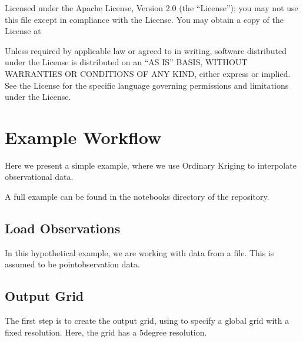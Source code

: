 \documentclass[letterpaper,10pt,english]{sphinxmanual}
\begin{document}
\sphinxAtStartPar
Licensed under the Apache License, Version 2.0 (the “License”);
you may not use this file except in compliance with the License.
You may obtain a copy of the License at
\begin{quote}

\sphinxAtStartPar
{}
\end{quote}

\sphinxAtStartPar
Unless required by applicable law or agreed to in writing, software
distributed under the License is distributed on an “AS IS” BASIS,
WITHOUT WARRANTIES OR CONDITIONS OF ANY KIND, either express or implied.
See the License for the specific language governing permissions and
limitations under the License.

\sphinxstepscope


\chapter{Example Workflow}
\label{\detokenize{workflow:example-workflow}}\label{\detokenize{workflow::doc}}
\sphinxAtStartPar
Here we present a simple example, where we use Ordinary Kriging to interpolate observational data.

\sphinxAtStartPar
A full example can be found in the notebooks directory of the repository.


\section{Load Observations}
\label{\detokenize{workflow:load-observations}}
\sphinxAtStartPar
In this hypothetical example, we are working with data from a  file. This is assumed to be
point\sphinxhyphen{}observation data.

\begin{sphinxVerbatim}[commandchars=\\\{\}]
   
\end{sphinxVerbatim}


\section{Output Grid}
\label{\detokenize{workflow:output-grid}}
\sphinxAtStartPar
The first step is to create the output grid, using
{\hyperref[\detokenize{covariance:glomar_gridding.grid.grid_from_resolution}]{}} to specify a global grid with a fixed
resolution. Here, the grid has a 5\sphinxhyphen{}degree resolution.
\end{document}
